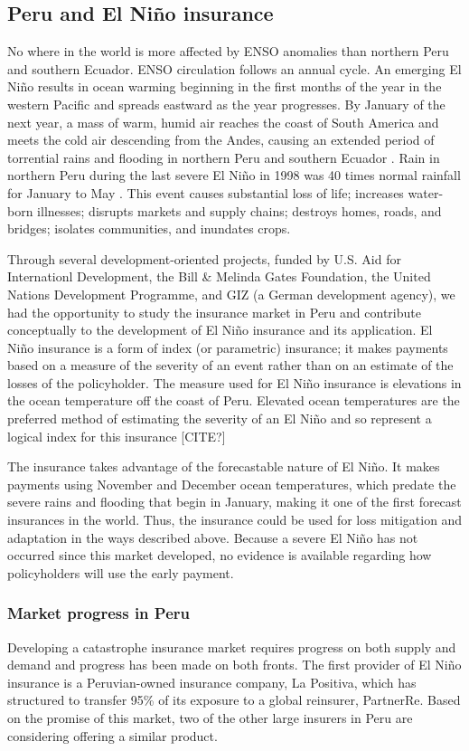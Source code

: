 \documentclass[authoryear]{article}
\begin{document}
\subsection{Peru and El Ni\~no insurance}
No where in the world is more affected by ENSO anomalies than northern Peru and southern Ecuador. ENSO circulation follows an annual cycle. An emerging El Ni\~no results in ocean warming beginning in the first months of the year in the western Pacific and spreads eastward as the year progresses. By January of the next year, a mass of warm, humid air reaches the coast of South America and meets the cold air descending from the Andes, causing an extended period of torrential rains and flooding in northern Peru and southern Ecuador \citep{lagos2008nino}. Rain in northern Peru during the last severe El Ni\~no in 1998 was 40 times normal rainfall for January to May \citep{skees2009enso}. This event causes substantial loss of life; increases water-born illnesses; disrupts markets and supply chains; destroys homes, roads, and bridges; isolates communities, and inundates crops.

Through several development-oriented projects, funded by U.S. Aid for Internationl Development, the Bill \& Melinda Gates Foundation, the United Nations Development Programme, and GIZ (a German development agency), we had the opportunity to study the insurance market in Peru and contribute conceptually to the development of El Ni\~no insurance and its application. El Ni\~no insurance is a form of index (or parametric) insurance; it makes payments based on a measure of the severity of an event rather than on an estimate of the losses of the policyholder. The measure used for El Ni\~no insurance is elevations in the ocean temperature off the coast of Peru. Elevated ocean temperatures are the preferred method of estimating the severity of an El Ni\~no and so represent a logical index for this insurance [CITE?]

The insurance takes advantage of the forecastable nature of El Ni\~no. It makes payments using November and December ocean temperatures, which predate the severe rains and flooding that begin in January, making it one of the first forecast insurances in the world. Thus, the insurance could be used for loss mitigation and adaptation in the ways described above. Because a severe El Ni\~no has not occurred since this market developed, no evidence is available regarding how policyholders will use the early payment.

\subsubsection{Market progress in Peru}
Developing a catastrophe insurance market requires progress on both supply and demand and progress has been made on both fronts. The first provider of El Ni\~no insurance is a Peruvian-owned insurance company, La Positiva, which has structured to transfer 95\% of its exposure to a global reinsurer, PartnerRe. Based on the promise of this market, two of the other large insurers in Peru are considering offering a similar product.
\end{document}
